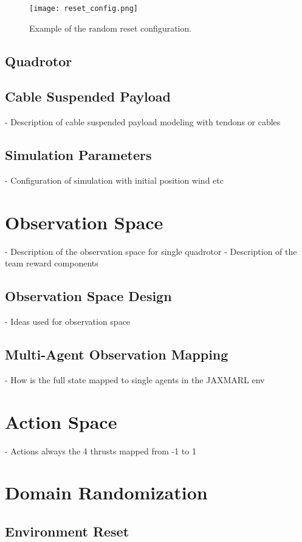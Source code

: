\begin{figure}
    \label{fig:reset_config}
    \centering
    \texttt{[image: reset\_config.png]}
    \caption{Example of the random reset configuration.}

\end{figure}



\subsection{Quadrotor}

\subsection{Cable Suspended Payload}
- Description of cable suspended payload modeling with tendons or cables
\subsection{Simulation Parameters}
- Configuration of simulation with initial position wind etc

\section{Observation Space}
- Description of the observation space for single quadrotor
- Description of the team reward components
\subsection{Observation Space Design}
- Ideas used for observation space
\subsection{Multi-Agent Observation Mapping}
- How is the full state mapped to single agents in the JAXMARL env

\section{Action Space}
- Actions always the 4 thrusts mapped from -1 to 1

\section{Domain Randomization}
\subsection{Environment Reset}

